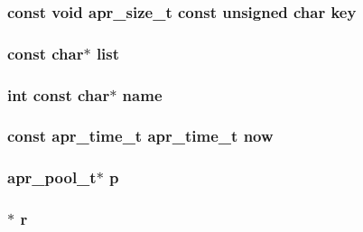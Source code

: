 \subsubsection[{\texorpdfstring{key}{key}}]{\setlength{\rightskip}{0pt plus 5cm}const {\bf void} {\bf apr\+\_\+size\+\_\+t} const unsigned char key}\hypertarget{group__MOD__CACHE_ga11d8023381192746eb96be162398fe1c}{}\label{group__MOD__CACHE_ga11d8023381192746eb96be162398fe1c}
\subsubsection[{\texorpdfstring{list}{list}}]{\setlength{\rightskip}{0pt plus 5cm}const char$\ast$ list}\hypertarget{group__MOD__CACHE_gac577f43b171a35e92134066e4044b860}{}\label{group__MOD__CACHE_gac577f43b171a35e92134066e4044b860}
\subsubsection[{\texorpdfstring{name}{name}}]{ {\bf int} const char$\ast$ name}\hypertarget{group__MOD__CACHE_gaa2898f544f5179902abf4aac7df35314}{}\label{group__MOD__CACHE_gaa2898f544f5179902abf4aac7df35314}
\subsubsection[{\texorpdfstring{now}{now}}]{\setlength{\rightskip}{0pt plus 5cm}const {\bf apr\+\_\+time\+\_\+t} {\bf apr\+\_\+time\+\_\+t} now}\hypertarget{group__MOD__CACHE_ga33504014e188d5d7506173cc14fb5801}{}\label{group__MOD__CACHE_ga33504014e188d5d7506173cc14fb5801}
\subsubsection[{\texorpdfstring{p}{p}}]{ {\bf apr\+\_\+pool\+\_\+t}$\ast$ p}\hypertarget{group__MOD__CACHE_ga500bb2716e136608a89fae583ed460cb}{}\label{group__MOD__CACHE_ga500bb2716e136608a89fae583ed460cb}
\subsubsection[{\texorpdfstring{r}{r}}]{$\ast$ r}\hypertarget{group__MOD__CACHE_gac68e921ed15f71060d618adb662a84f6}{}\label{group__MOD__CACHE_gac68e921ed15f71060d618adb662a84f6}
